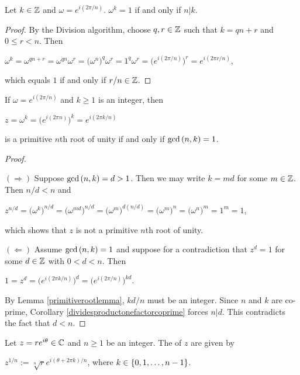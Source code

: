 \documentclass[11pt,fleqn,dvipsnames,usenames]{article}
\begin{document}
\begin{lemma}\label{primitiverootlemma}
Let $k\in\mathbb{Z}$ and $\omega = e^{i(2\pi/n)}$.  $\omega^{k} = 1$ if and only if $n|k$.
\end{lemma}
%
\begin{proof}
By the Division algorithm, choose $q,r\in\mathbb{Z}$ such that $k = qn + r$ and $0\leq r < n$.  Then
\begin{center}
$\omega^{k} = \omega^{qn + r} = \omega^{qn}\omega^{r} = \big(\omega^{n})^{q}\omega^{r} = 1^{q}\omega^{r} = \big(e^{i(2\pi/n)}\big)^{r} = e^{i(2\pi r/n)}$,
\end{center}
which equals $1$ if and only if $r/n\in\mathbb{Z}$.
\end{proof}
%
\begin{theorem}
If $\omega = e^{i(2\pi/n)}$ and $k\geq 1$ is an integer, then
\begin{center}
$z = \omega^{k} = \big(e^{i(2\pi n)}\big)^{k} = e^{i(2\pi k/n)}$
\end{center}
is a primitive $n$th root of unity if and only if $\text{gcd}\left(n,k\right) = 1$.
\end{theorem}
%
\begin{proof}~

$(\Rightarrow)$ Suppose $\text{gcd}\left(n,k\right) = d > 1$.  Then we may write $k = md$ for some $m\in\mathbb{Z}$.  Then $n/d < n$ and
\begin{center}
$z^{n/d} = \big(\omega^{k}\big)^{n/d} = \big(\omega^{md}\big)^{n/d} =  \big(\omega^{m}\big)^{d(n/d)} = \big(\omega^{m}\big)^{n} = \big(\omega^{n}\big)^{m} = 1^{m} = 1$,
\end{center}
which shows that $z$ is not a primitive $n$th root of unity.
\vsp

$(\Leftarrow)$ Assume $\text{gcd}\left(n,k\right) = 1$ and suppose for a contradiction that $z^{d} = 1$ for some $d\in\mathbb{Z}$ with $0 < d < n$.  Then
\begin{center}
$1 = z^{d} = \big(e^{i(2\pi k/n)}\big)^{d} = \big(e^{i(2\pi/n)}\big)^{kd}$.
\end{center}
By Lemma \ref{primitiverootlemma}, $kd/n$ must be an integer.  Since $n$ and $k$ are co-prime, Corollary \ref{dividesproductonefactorcoprime} forces $n|d$.  This contradicts the fact that $d<n$.
\end{proof}
%
\begin{definition}
Let $z = re^{i\theta}\in \mathbb{C}$ and $n\geq 1$ be an integer. The  of $z$ are given by
\begin{center}
$z^{1/n} := \sqrt[n]{r}e^{i(\theta + 2\pi k)/n}$, where $k\in\left\{0, 1, \ldots, n -1\right\}$.
\end{center}
\end{definition}
\end{document}
